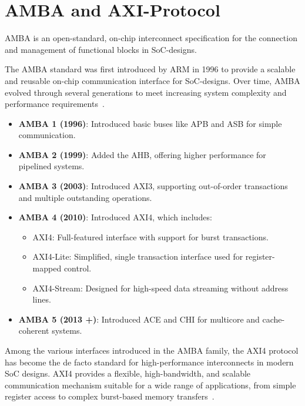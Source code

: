 \section{AMBA and AXI-Protocol}

\acl{AMBA} is an open-standard, on-chip interconnect specification for the connection and management of functional blocks in \acs{SoC}-designs. 

The \ac{AMBA} standard was first introduced by ARM in 1996 to provide a scalable and reusable on-chip communication interface for \acs{SoC}-designs. Over time, \acs{AMBA} evolved through several generations to meet increasing system complexity and performance requirements~\cite{walshe_what_2014}.

\begin{itemize}
    \item \textbf{AMBA 1 (1996)}: Introduced basic buses like \ac{APB} and \ac{ASB} for simple communication.
    \item \textbf{AMBA 2 (1999)}: Added the \ac{AHB}, offering higher performance for pipelined systems.
    \item \textbf{AMBA 3 (2003)}: Introduced \ac{AXI3}, supporting out-of-order transactions and multiple outstanding operations.
    \item \textbf{AMBA 4 (2010)}: Introduced \ac{AXI4}, which includes:
        \begin{itemize}
            \item AXI4: Full-featured interface with support for burst transactions.
            \item AXI4-Lite: Simplified, single transaction interface used for register-mapped control.
            \item AXI4-Stream: Designed for high-speed data streaming without address lines.
        \end{itemize}
    \item \textbf{AMBA 5 (2013 +)}: Introduced \ac{ACE} and \ac{CHI} for multicore and cache-coherent systems.
\end{itemize}

Among the various interfaces introduced in the AMBA family, the \ac{AXI4} protocol has become the de facto standard for high-performance interconnects in modern SoC designs. AXI4 provides a flexible, high-bandwidth, and scalable communication mechanism suitable for a wide range of applications, from simple register access to complex burst-based memory transfers~\cite{aldec_inc_xilinx_2025}.


